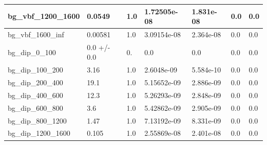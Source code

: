 \documentclass[a4paper, 10pt]{article}
\begin{document}
\begin{table}[H]
\begin{center}
\begin{tabular}{|m{23.0mm}|m{23.0mm}|m{18.0mm}|m{19.0mm}|m{19.0mm}|m{19.0mm}|m{19.0mm}|}
      \hline
      {\cellcolor{white}         bg\_vbf\_1200\_1600}& {\cellcolor{white}         0.0549}& {\cellcolor{white}         1.0}& {\cellcolor{white}         1.72505e-08}& {\cellcolor{white}         1.831e-08}& {\cellcolor{green}         0.0}& {\cellcolor{green}         0.0}\\
      \hline
      {\cellcolor{white}         bg\_vbf\_1600\_inf}& {\cellcolor{white}         0.00581}& {\cellcolor{white}         1.0}& {\cellcolor{white}         3.09154e-08}& {\cellcolor{white}         2.364e-08}& {\cellcolor{green}         0.0}& {\cellcolor{green}         0.0}\\
      \hline
      {\cellcolor{white}         bg\_dip\_0\_100}& {\cellcolor{white}         0.0 +/\-- 0.0}& {\cellcolor{white}         0.}& {\cellcolor{white}         0.0}& {\cellcolor{white}         0.0}& {\cellcolor{green}         0.0}& {\cellcolor{green}         0.0}\\
      \hline
      {\cellcolor{white}         bg\_dip\_100\_200}& {\cellcolor{white}         3.16}& {\cellcolor{white}         1.0}& {\cellcolor{white}         2.6048e-09}& {\cellcolor{white}         5.584e-10}& {\cellcolor{green}         0.0}& {\cellcolor{green}         0.0}\\
      \hline
      {\cellcolor{white}         bg\_dip\_200\_400}& {\cellcolor{white}         19.1}& {\cellcolor{white}         1.0}& {\cellcolor{white}         5.15652e-09}& {\cellcolor{white}         2.886e-09}& {\cellcolor{green}         0.0}& {\cellcolor{green}         0.0}\\
      \hline
      {\cellcolor{white}         bg\_dip\_400\_600}& {\cellcolor{white}         12.3}& {\cellcolor{white}         1.0}& {\cellcolor{white}         5.26293e-09}& {\cellcolor{white}         2.848e-09}& {\cellcolor{green}         0.0}& {\cellcolor{green}         0.0}\\
      \hline
      {\cellcolor{white}         bg\_dip\_600\_800}& {\cellcolor{white}         3.6}& {\cellcolor{white}         1.0}& {\cellcolor{white}         5.42862e-09}& {\cellcolor{white}         2.905e-09}& {\cellcolor{green}         0.0}& {\cellcolor{green}         0.0}\\
      \hline
      {\cellcolor{white}         bg\_dip\_800\_1200}& {\cellcolor{white}         1.47}& {\cellcolor{white}         1.0}& {\cellcolor{white}         7.13192e-09}& {\cellcolor{white}         8.331e-09}& {\cellcolor{green}         0.0}& {\cellcolor{green}         0.0}\\
      \hline
      {\cellcolor{white}         bg\_dip\_1200\_1600}& {\cellcolor{white}         0.105}& {\cellcolor{white}         1.0}& {\cellcolor{white}         2.55869e-08}& {\cellcolor{white}         2.401e-08}& {\cellcolor{green}         0.0}& {\cellcolor{green}         0.0}\\

\end{tabular}
\end{center}
\end{table}
\end{document}
